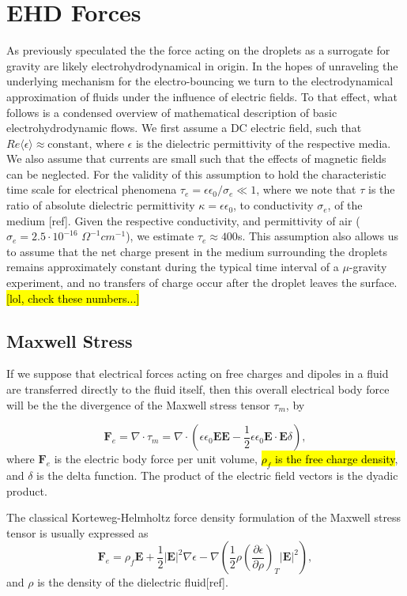 \documentclass[a4paper, 12pt]{article}
\begin{document}
\section{EHD Forces}
As previously speculated the the force acting on the droplets as a surrogate for gravity are likely electrohydrodynamical in origin. In the hopes of unraveling the underlying mechanism for the electro-bouncing we turn to the electrodynamical approximation of fluids under the influence of electric fields. To that effect, what follows is a condensed overview of mathematical description of basic electrohydrodynamic flows. We first assume a DC electric field, such that $Re \langle \epsilon \rangle \approx  \mbox{constant}$, where $\epsilon$ is the dielectric permittivity of the respective media. We also assume that currents are small such that the effects of magnetic fields can be neglected. For the validity of this assumption to hold the characteristic time scale for electrical phenomena $\tau_e = \epsilon \epsilon_0/\sigma_e \ll 1$, where we note that $\tau$ is the ratio of absolute dielectric permittivity $\kappa = \epsilon \epsilon_0$, to conductivity $\sigma_e$, of the medium [ref]. Given the respective conductivity, and permittivity of air ($\sigma_e = 2.5 \cdot 10^{-16}$ $\Omega^{-1} cm^{-1}$), we estimate $\tau_e \approx 400$s. This assumption also allows us to assume that the net charge present in the medium surrounding the droplets remains approximately constant during the typical time interval of a $\mu$-gravity experiment, and no transfers of charge occur after the droplet leaves the surface. \hl{[lol, check these numbers...]}

\subsection{Maxwell Stress}
If we suppose that electrical forces acting on free charges and dipoles in a fluid are transferred directly to the fluid itself, then this overall electrical body force will be the the divergence of the Maxwell stress tensor $\tau_m $, by

\[ \mathbf{F}_e = \nabla \cdot \tau_m = \nabla \cdot \left( \epsilon \epsilon_0 \mathbf{E} \mathbf{E} - \frac{1}{2} \epsilon \epsilon_0 \mathbf{E} \cdot \mathbf{E} \delta \right) ,\]
where $\mathbf{F}_e$ is the electric body force per unit volume, \hl{$\rho_f$ is the free charge density}, and $\delta$ is the delta function. The product of the electric field vectors is the dyadic product.  

The classical Korteweg-Helmholtz force density formulation of the Maxwell stress tensor is usually expressed as 
\begin{equation}
\mathbf{F}_e = \rho_f \mathbf{E} + \frac{1}{2} \left| \mathbf{E} \right|^2 \nabla \epsilon - \nabla \left( \frac{1}{2} \rho \left( \frac{\partial \epsilon}{\partial \rho} \right)_T \left| \mathbf{E} \right|^2 \right) ,
\end{equation}
and $\rho$ is the density of the dielectric fluid[ref].
\end{document}
